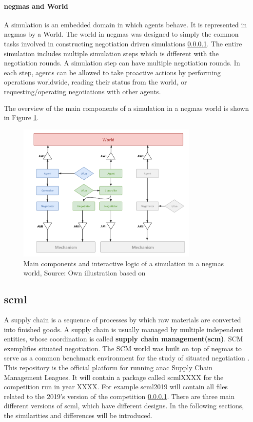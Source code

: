 \paragraph{\gls{negmas} and World}
A simulation is an embedded domain in which agents behave. It is represented in \gls{negmas} by a World. The world in \gls{negmas} was designed to simply the common tasks involved in constructing negotiation driven simulations \ref{}. The entire simulation includes multiple simulation steps which is different with the negotiation rounds. A simulation step can have multiple negotiation rounds. In each step, agents can be allowed to take proactive actions by performing operations worldwide, reading their status from the world, or requesting/operating negotiations with other agents.

The overview of the main components of a simulation in a \gls{negmas} world is shown in Figure \ref{fig:overview-negmas}.

\begin{figure}[htbp]
\centering
\includegraphics[width=0.8\textwidth]{./images/overview-negmas.png}
\caption{Main components and interactive logic of a simulation in a \gls{negmas} world, Source: Own illustration based on\parencite{Mohammad2019}}
\label{fig:overview-negmas}
\end{figure}

\subsection{\gls{scml}} \label{background-scml}
A supply chain is a sequence of processes by which raw materials are converted into finished goods. A supply chain is usually managed by multiple independent entities, whose coordination is called \textbf{supply chain management(\gls{scm})}. SCM exemplifies situated negotiation. The SCM world was built on top of  \gls{negmas} to serve as a common benchmark environment for the study of situated negotiation \parencite{Mohammad2019}. This repository is the official platform for running \gls{anac} Supply Chain Management Leagues. It will contain a package called scmlXXXX for the competition run in year XXXX. For example scml2019 will contain all files related to the 2019’s version of the competition \ref{}.
There are three main different versions of \gls{scml}, which have different designs. In the following sections, the similarities and differences will be introduced. 

